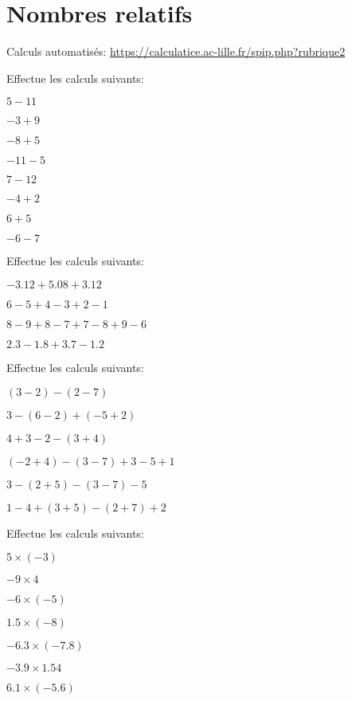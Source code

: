 \section{Nombres relatifs}

Calculs automatisés: \url{https://calculatice.ac-lille.fr/spip.php?rubrique2}

\begin{exercice}
	Effectue les calculs suivants:
	\begin{exerciceenum}
		\item $5 - 11$
		\item $-3+9$
		\item $-8+5$
		\item $- 11 - 5$
		\item $7 - 12$
		\item $-4+2$
		\item $6+5$
		\item $- 6 - 7$
	\end{exerciceenum}
\end{exercice}

\begin{exercice}
	Effectue les calculs suivants:
	\begin{exerciceenum}
		\item $- 3.12 + 5.08 + 3.12$
		\item $6-5+4-3+2-1$
		\item $8-9+8-7+7-8+9-6$
		\item $2.3 - 1.8 + 3.7 - 1.2$
	\end{exerciceenum}
\end{exercice}

\begin{exercice}
	Effectue les calculs suivants:
	\begin{exerciceenum}
		\item $(3-2)-(2-7)$
		\item $3-(6-2)+(-5+2)$
		\item $4+3-2-(3+4)$
		\item $(-2+4)-(3-7)+3-5+1$
		\item $3 - (2 + 5) - (3 - 7) - 5$
		\item $1 - 4 + (3 + 5) - (2 + 7) + 2$
	\end{exerciceenum}
\end{exercice}

\begin{exercice}
	Effectue les calculs suivants:
	\begin{exerciceenum}
		\item $5 \times (-3)$
		\item $-9 \times 4$
		\item $-6 \times (-5)$
		\item $1.5 \times (-8)$
		\item $-6.3 \times (-7.8)$
		\item $- 3.9 \times 1.54$
		\item $6.1 \times (-5.6)$
	\end{exerciceenum}
\end{exercice}



